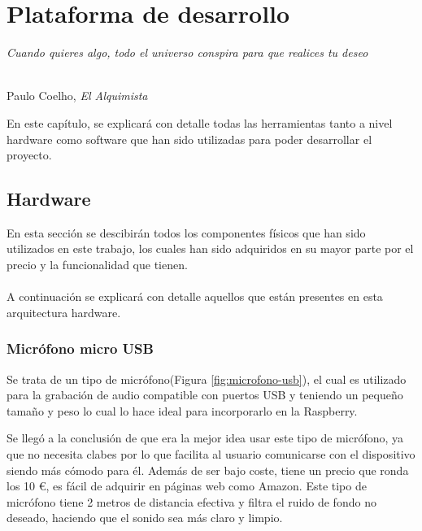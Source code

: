 \chapter{Plataforma de desarrollo}
\label{cap:capitulo4}


\begin{flushright}
\begin{minipage}[]{10cm}
\emph{Cuando quieres algo, todo el universo conspira para que realices tu deseo}\\
\end{minipage}\\

Paulo Coelho, \textit{El Alquimista}\\
\end{flushright}

\vspace{1cm}

En este capítulo, se explicará con detalle todas las herramientas tanto a nivel hardware como software que han sido utilizadas para poder desarrollar el proyecto.


\section{Hardware}
\label{sec:hardware}

En esta sección se descibirán todos los componentes físicos que han sido utilizados en este trabajo, los cuales han sido adquiridos en su mayor parte por el precio y la funcionalidad que tienen.\\ \\
A continuación se explicará con detalle aquellos que están presentes en esta arquitectura hardware.

\subsection{Micrófono micro USB}
\label{subsec:micro}

Se trata de un tipo de micrófono(Figura \ref{fig:microfono-usb}), el cual es utilizado para la grabación de audio compatible con puertos USB y teniendo un pequeño tamaño y peso lo cual lo hace ideal para incorporarlo en la Raspberry. 


Se llegó a la conclusión de que era la mejor idea usar este tipo de micrófono, ya que no necesita clabes por lo que facilita al usuario comunicarse con el dispositivo siendo más cómodo para él. Además de ser bajo coste, tiene un precio que ronda los 10 \euro, es fácil de adquirir en páginas web como Amazon. Este tipo de micrófono tiene 2 metros de distancia efectiva y filtra el ruido de fondo no deseado, haciendo que el sonido sea más claro y limpio.


